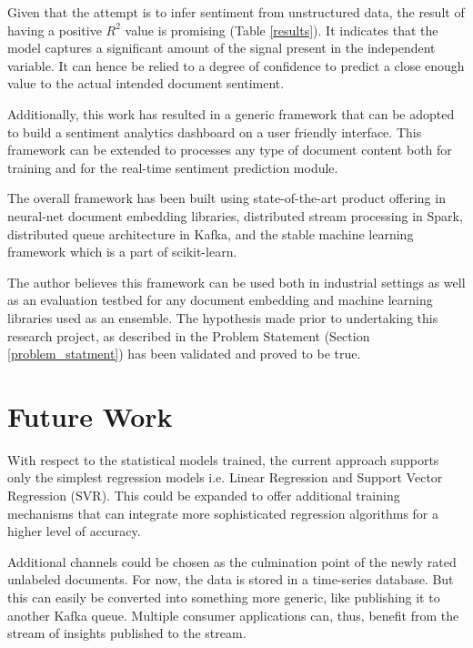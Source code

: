 \documentclass[conference]{IEEEtran}
\begin{document}
    Given that the attempt is to infer sentiment from unstructured data, the result of having a positive $R^2$ value is promising (Table \ref{results}).
    It indicates that the model captures a significant amount of the signal present in the independent variable.
    It can hence be relied to a degree of confidence to predict a close enough value to the actual intended document sentiment.

    Additionally, this work has resulted in a generic framework that can be adopted to build a sentiment analytics dashboard on a user friendly interface. 
    This framework can be extended to processes any type of document content both for training and for the real-time sentiment prediction module.

    The overall framework has been built using state-of-the-art product offering in neural-net document embedding libraries, distributed stream processing in Spark, distributed queue architecture in Kafka, and the stable machine learning framework which is a part of scikit-learn. 

    The author believes this framework can be used both in industrial settings as well as an evaluation testbed for any document embedding and machine learning libraries used as an ensemble. The hypothesis made prior to undertaking this research project, as described in the Problem Statement (Section \ref{problem_statment}) has been validated and proved to be true.

\vspace{5mm}

\section{Future Work} \label{future_work}
    With respect to the statistical models trained, the current approach supports only the simplest regression models i.e. Linear Regression and Support Vector Regression (SVR). 
    This could be expanded to offer additional training mechanisms that can integrate more sophisticated regression algorithms for a higher level of accuracy.
     
    Additional channels could be chosen as the culmination point of the newly rated unlabeled documents.
    For now, the data is stored in a time-series database.
    But this can easily be converted into something more generic, like publishing it to another Kafka queue.
    Multiple consumer applications can, thus, benefit from the stream of insights published to the stream.
\end{document}
